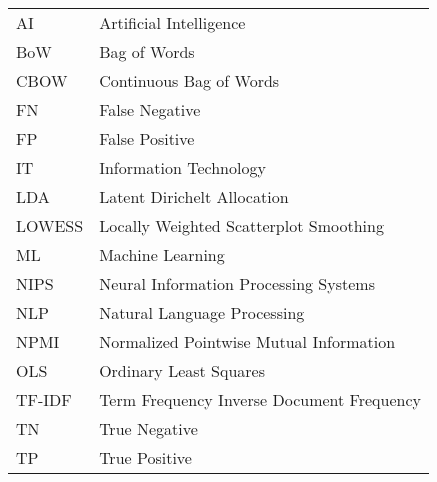 \begin{longtable}{ll}
	AI     & Artificial Intelligence                   \\
	BoW    & Bag of Words                              \\
	CBOW   & Continuous Bag of Words                   \\
	FN     & False Negative                            \\
	FP     & False Positive                            \\
	IT     & Information Technology                    \\
	LDA    & Latent Dirichelt Allocation               \\
	LOWESS & Locally Weighted Scatterplot Smoothing    \\
	ML     & Machine Learning                          \\
	NIPS   & Neural Information Processing Systems     \\
	NLP    & Natural Language Processing               \\
	NPMI   & Normalized Pointwise Mutual Information   \\
	OLS    & Ordinary Least Squares                    \\
	TF-IDF & Term Frequency Inverse Document Frequency \\
	TN     & True Negative                             \\
	TP     & True Positive                             \\
\end{longtable}

